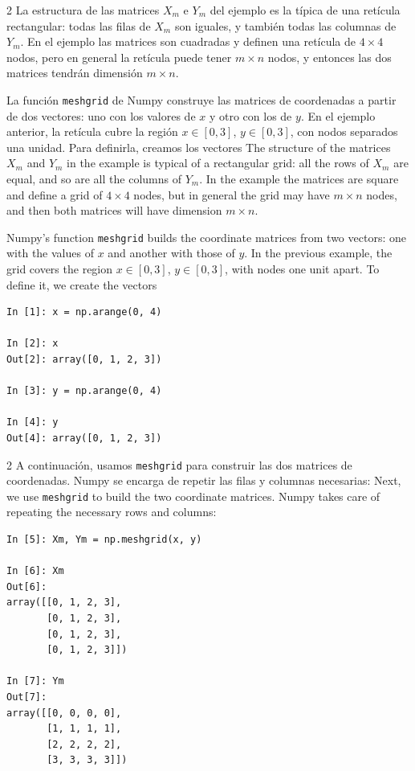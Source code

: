 \begin{paracol}{2}
La estructura de las matrices $X_m$ e $Y_m$ del ejemplo es la típica de una retícula rectangular: todas las filas de $X_m$ son iguales, y también todas las columnas de $Y_m$. En el ejemplo las matrices son cuadradas y definen una retícula de $4\times 4$ nodos, pero en general la retícula puede tener $m\times n$ nodos, y entonces las dos matrices tendrán dimensión $m\times n$.

La función \texttt{meshgrid} de Numpy construye las matrices de coordenadas a partir de dos vectores: uno con los valores de $x$ y otro con los de $y$. En el ejemplo anterior, la retícula cubre la región $x\in[0,3]$, $y\in[0,3]$, con nodos separados una unidad. Para definirla, creamos los vectores
\switchcolumn
The structure of the matrices $X_m$ and $Y_m$ in the example is typical of a rectangular grid: all the rows of $X_m$ are equal, and so are all the columns of $Y_m$. In the example the matrices are square and define a grid of $4\times 4$ nodes, but in general the grid may have $m\times n$ nodes, and then both matrices will have dimension $m\times n$.

Numpy's function \texttt{meshgrid} builds the coordinate matrices from two vectors: one with the values of $x$ and another with those of $y$. In the previous example, the grid covers the region $x\in[0,3]$, $y\in[0,3]$, with nodes one unit apart. To define it, we create the vectors
\end{paracol}
\begin{verbatim}
In [1]: x = np.arange(0, 4)

In [2]: x
Out[2]: array([0, 1, 2, 3])

In [3]: y = np.arange(0, 4)

In [4]: y
Out[4]: array([0, 1, 2, 3])
\end{verbatim}
\begin{paracol}{2}
A continuación, usamos \texttt{meshgrid} para construir las dos matrices de coordenadas. Numpy se encarga de repetir las filas y columnas necesarias:
\switchcolumn
Next, we use \texttt{meshgrid} to build the two coordinate matrices. Numpy takes care of repeating the necessary rows and columns:
\end{paracol}
\begin{verbatim}
In [5]: Xm, Ym = np.meshgrid(x, y)

In [6]: Xm
Out[6]:
array([[0, 1, 2, 3],
       [0, 1, 2, 3],
       [0, 1, 2, 3],
       [0, 1, 2, 3]])

In [7]: Ym
Out[7]:
array([[0, 0, 0, 0],
       [1, 1, 1, 1],
       [2, 2, 2, 2],
       [3, 3, 3, 3]])
\end{verbatim}
